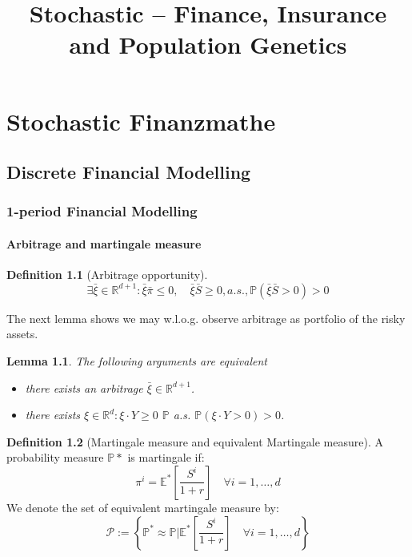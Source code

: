 \documentclass[a4paper,11pt]{book}
\newtheorem{lemma}[theorem]{Lemma}
\theoremstyle{definition}
\newtheorem{definition}{Definition}[section]
\theoremstyle{remark}
\begin{document}
\title{Stochastic -- Finance, Insurance and Population Genetics}

\chapter{Stochastic Finanzmathe}
\section{Discrete Financial Modelling}
\subsection{1-period Financial Modelling}
\subsubsection{Arbitrage and martingale measure}
\begin{definition}[Arbitrage opportunity]
\begin{equation*}
	\exists \bar{\xi} \in \mathbb{R}^{d+1}: \bar{\xi} \bar{\pi} \leq 0, \quad \bar{\xi} \bar{S} \geq 0, a.s., \mathbb{P}(\bar{\xi} \bar{S} > 0) > 0
\end{equation*}
\end{definition}


The next lemma shows we may w.l.o.g. observe arbitrage as portfolio of the risky assets. 
\begin{lemma}
	The following arguments are equivalent 
	\begin{itemize}
		\item there exists an arbitrage $\bar{\xi} \in \mathbb{R}^{d+1}$. 
		\item there exists $\xi \in \mathbb{R}^d: \xi \cdot Y \ge 0$ $\mathbb{P}$ a.s. $\mathbb{P}( \xi \cdot Y > 0) >0$. 
	\end{itemize}
\end{lemma}

\begin{definition}[Martingale measure and equivalent Martingale measure]
A probability measure $\mathbb{P}*$ is martingale if:
\begin{equation*}
	\pi^i = \mathbb{E}^*\left[\frac{S^i}{1 + r}\right] \quad \forall i = 1, \dots, d
\end{equation*}
We denote the set of equivalent martingale measure by:
\begin{equation*}
	\mathcal{P}:= \left\{\mathbb{P}^* \approx \mathbb{P}| \mathbb{E}^*\left[\frac{S^i}{1 + r}\right] \quad \forall i = 1, \dots, d \right\}
\end{equation*}
\end{definition}
\end{document}
